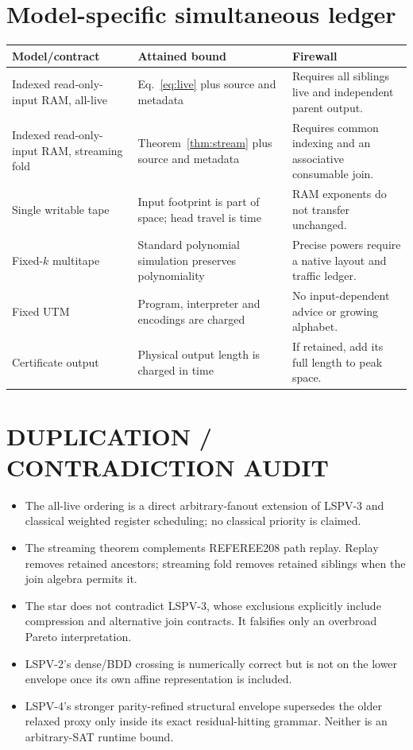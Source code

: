 \documentclass[11pt]{article}
\begin{document}
\section{Model-specific simultaneous ledger}

\begin{longtable}{p{.20\linewidth}p{.34\linewidth}p{.35\linewidth}}
\toprule
Model/contract & Attained bound & Firewall\\
\midrule
Indexed read-only-input RAM, all-live & Eq.~\ref{eq:live} plus source and metadata & Requires all
siblings live and independent parent output.\\
Indexed read-only-input RAM, streaming fold & Theorem~\ref{thm:stream} plus source and metadata &
Requires common indexing and an associative consumable join.\\
Single writable tape & Input footprint is part of space; head travel is time & RAM exponents do not
transfer unchanged.\\
Fixed-$k$ multitape & Standard polynomial simulation preserves polynomiality & Precise powers require
a native layout and traffic ledger.\\
Fixed UTM & Program, interpreter and encodings are charged & No input-dependent advice or growing
alphabet.\\
Certificate output & Physical output length is charged in time & If retained, add its full length to
peak space.\\
\bottomrule
\end{longtable}

\section{DUPLICATION / CONTRADICTION AUDIT}

\begin{itemize}
\item The all-live ordering is a direct arbitrary-fanout extension of LSPV-3 and classical weighted
register scheduling; no classical priority is claimed.
\item The streaming theorem complements REFEREE208 path replay.  Replay removes retained ancestors;
streaming fold removes retained siblings when the join algebra permits it.
\item The star does not contradict LSPV-3, whose exclusions explicitly include compression and
alternative join contracts.  It falsifies only an overbroad Pareto interpretation.
\item LSPV-2's dense/BDD crossing is numerically correct but is not on the lower envelope once its own
affine representation is included.
\item LSPV-4's stronger parity-refined structural envelope supersedes the older relaxed proxy only
inside its exact residual-hitting grammar.  Neither is an arbitrary-SAT runtime bound.
\end{itemize}
\end{document}
